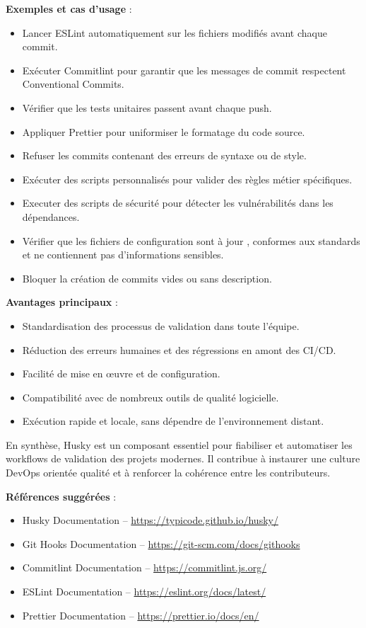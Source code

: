 \textbf{Exemples et cas d’usage} :
\begin{itemize}
	\item Lancer ESLint automatiquement sur les fichiers modifiés avant chaque commit.
	\item Exécuter Commitlint pour garantir que les messages de commit respectent Conventional Commits.
	\item Vérifier que les tests unitaires passent avant chaque push.
	\item Appliquer Prettier pour uniformiser le formatage du code source.
	\item Refuser les commits contenant des erreurs de syntaxe ou de style.
	\item Exécuter des scripts personnalisés pour valider des règles métier spécifiques.
	\item Executer des scripts de sécurité pour détecter les vulnérabilités dans les dépendances.
	\item Vérifier que les fichiers de configuration sont à jour , conformes aux standards et ne contiennent pas d'informations sensibles.
	\item Bloquer la création de commits vides ou sans description.
\end{itemize}

\textbf{Avantages principaux} :
\begin{itemize}
	\item Standardisation des processus de validation dans toute l’équipe.
	\item Réduction des erreurs humaines et des régressions en amont des CI/CD.
	\item Facilité de mise en œuvre et de configuration.
	\item Compatibilité avec de nombreux outils de qualité logicielle.
	\item Exécution rapide et locale, sans dépendre de l’environnement distant.
\end{itemize}

En synthèse, Husky est un composant essentiel pour fiabiliser et automatiser les workflows de validation des projets modernes. Il contribue à instaurer une culture DevOps orientée qualité et à renforcer la cohérence entre les contributeurs.

\textbf{Références suggérées} :
\begin{itemize}
	\item Husky Documentation – \url{https://typicode.github.io/husky/}
	\item Git Hooks Documentation – \url{https://git-scm.com/docs/githooks}
	\item Commitlint Documentation – \url{https://commitlint.js.org/}
	\item ESLint Documentation – \url{https://eslint.org/docs/latest/}
	\item Prettier Documentation – \url{https://prettier.io/docs/en/}
\end{itemize}

